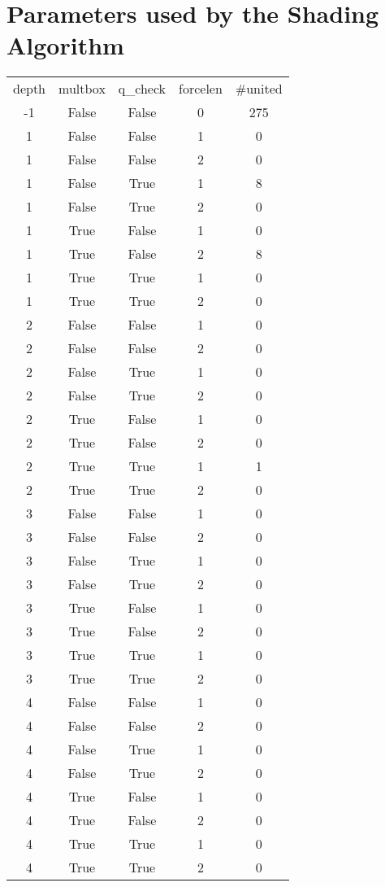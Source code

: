 \documentclass[12pt,reqno]{amsart}
\theoremstyle{plain}
\theoremstyle{definition}
\numberwithin{equation}{section}
\begin{document}
\section{Parameters used by the Shading Algorithm}
\begin{longtable}{ccccc} 
depth & multbox & q\_{}check & forcelen & \#united \\ 
-1 & False & False & 0 & 275 \\ 
1 & False & False & 1 & 0 \\ 
1 & False & False & 2 & 0 \\ 
1 & False & True & 1 & 8 \\ 
1 & False & True & 2 & 0 \\ 
1 & True & False & 1 & 0 \\ 
1 & True & False & 2 & 8 \\ 
1 & True & True & 1 & 0 \\ 
1 & True & True & 2 & 0 \\ 
2 & False & False & 1 & 0 \\ 
2 & False & False & 2 & 0 \\ 
2 & False & True & 1 & 0 \\ 
2 & False & True & 2 & 0 \\ 
2 & True & False & 1 & 0 \\ 
2 & True & False & 2 & 0 \\ 
2 & True & True & 1 & 1 \\ 
2 & True & True & 2 & 0 \\ 
3 & False & False & 1 & 0 \\ 
3 & False & False & 2 & 0 \\ 
3 & False & True & 1 & 0 \\ 
3 & False & True & 2 & 0 \\ 
3 & True & False & 1 & 0 \\ 
3 & True & False & 2 & 0 \\ 
3 & True & True & 1 & 0 \\ 
3 & True & True & 2 & 0 \\ 
4 & False & False & 1 & 0 \\ 
4 & False & False & 2 & 0 \\ 
4 & False & True & 1 & 0 \\ 
4 & False & True & 2 & 0 \\ 
4 & True & False & 1 & 0 \\ 
4 & True & False & 2 & 0 \\ 
4 & True & True & 1 & 0 \\ 
4 & True & True & 2 & 0 \\ 

\end{longtable}
\end{document}
